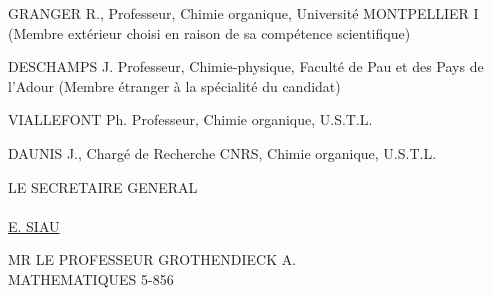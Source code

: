GRANGER R., Professeur, Chimie organique, Université MONTPELLIER I (Membre extérieur choisi en raison de sa compétence scientifique)

DESCHAMPS J. Professeur, Chimie-physique, Faculté de Pau et des Pays de l'Adour (Membre étranger à la spécialité du candidat)

VIALLEFONT Ph. Professeur, Chimie organique, U.S.T.L.

DAUNIS J., Chargé de Recherche CNRS, Chimie organique, U.S.T.L.

LE SECRETAIRE GENERAL\\
\\
\uline{E. SIAU}

MR LE PROFESSEUR GROTHENDIECK A.\\
MATHEMATIQUES \hfill 5-856
